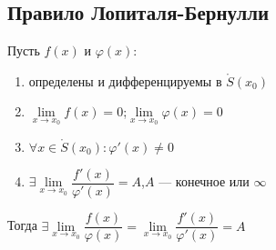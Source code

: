 \subsection{Правило Лопиталя-Бернулли}
\begin{theorem}
	Пусть $f(x)$ и $\varphi(x)$:
	\begin{enumerate}
		\item определены и дифференцируемы в $\mathring{S}(x_0)$
		\item $\lim\limits_{x \to x_0}f(x) = 0$;\quad $\lim\limits_{x\to x_0}\varphi(x) = 0$
		\item $\forall x \in \mathring{S}(x_0)\colon \varphi'(x)\ne 0$
		\item $\exists \lim\limits_{x \to x_0}\dfrac{f'(x)}{\varphi'(x)}= A$,\quad $A$ --- конечное или $\infty$
	\end{enumerate}
	Тогда $\exists \lim\limits_{x \to x_0} \dfrac{f(x)}{\varphi(x)} = \lim\limits_{x \to x_0}\dfrac{f'(x)}{\varphi'(x)}=A$
\end{theorem}
